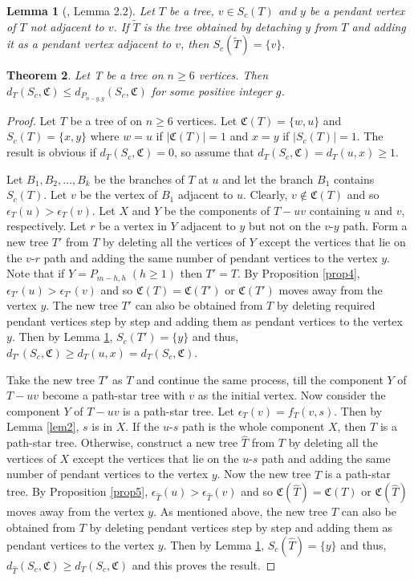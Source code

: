 \documentclass[11pt]{article}
\newtheorem{theorem}{Theorem}[section]
\newtheorem{lemma}[theorem]{Lemma}
\begin{document}
\begin{lemma}[\cite{Des}, Lemma 2.2]\label{lem:sc1}
Let $T$ be a tree, $v\in S_c(T)$ and $y$ be a pendant vertex of $T$ not adjacent to $v$. If $\tilde{T}$ is the tree obtained by detaching $y$ from $T$ and adding it as a pendant vertex adjacent to $v$, then $S_c(\tilde{T}) = \{v\}.$
\end{lemma}
\begin{theorem}\label{thm:sc1}
Let T be a tree on $n\geq 6$ vertices. Then  $d_T(S_c,\mathfrak{C})\leq d_{P_{n-g,g}}(S_c,\mathfrak{C})$ for some positive integer $g$.
\end{theorem}
\begin{proof}
Let $T$ be a tree of on $n\geq 6$ vertices. Let $\mathfrak{C}(T)=\{w,u\}$ and $S_c(T)=\{x,y\}$ where $w=u$ if $|\mathfrak{C}(T)|=1$ and $x=y$ if $|S_c(T)|=1$.  The result is obvious if $d_T(S_c,\mathfrak{C})=0$, so assume that  $d_T(S_c,\mathfrak{C})=d_T(u,x)\geq 1$.

Let $B_1,B_2,\ldots,B_k$ be the branches of $T$ at $u$ and let the branch $B_1$ contains $S_c(T).$ Let $v$ be the vertex of $B_1$ adjacent to $u$. Clearly, $v\notin \mathfrak{C}(T)$ and so $\epsilon_T(u)>\epsilon_T(v)$. Let $X$ and $Y$ be the components of $T-uv$ containing $u$ and $v$, respectively. Let $r$ be a vertex in $Y$ adjacent to $y$ but not on the $v$-$y$ path. Form  a new tree $T'$ from $T$ by deleting all the vertices of $Y$ except the vertices that lie on the $v$-$r$ path and adding the same number of pendant vertices to the vertex $y$. Note that if $Y=P_{m-h,h}\;(h\geq 1)$ then $T'=T.$ By Proposition \ref{prop4}, $\epsilon_{T'}(u)>\epsilon_{T'}(v)$ and so $\mathfrak{C}(T)=\mathfrak{C}(T')$ or $\mathfrak{C}(T')$ moves away from the vertex $y$. The new tree $T'$ can also be obtained from $T$ by deleting required pendant vertices step by step and adding them as pendant vertices to the vertex $y$. Then by Lemma \ref{lem:sc1}, $S_c(T')=\{y\}$ and thus,  $d_{T'}(S_c,\mathfrak{C})\geq d_T(u,x)=d_T(S_c,\mathfrak{C})$.

Take the new tree $T'$ as $T$ and continue the same process, till the component $Y$ of $T-uv$ become a path-star tree with $v$ as the initial vertex. Now consider the component $Y$ of $T-uv$ is a path-star tree. Let  $\epsilon_{T}(v)=f_T(v,s)$. Then by Lemma \ref{lem2}, $s$ is in $X$. If  the $u$-$s$ path is the whole component $X$, then $T$ is a path-star tree. Otherwise, construct a new tree 
$\hat{T}$ from $T$ by deleting all the vertices of $X$ except the vertices that lie on the $u$-$s$ path and adding the same number of pendant vertices to the vertex $y$. Now the new tree $\hat{T}$ is a path-star tree. By Proposition \ref{prop5}, $\epsilon_{\hat{T}}(u)>\epsilon_{\hat{T}}(v)$ and so $\mathfrak{C}(\hat{T})=\mathfrak{C}(T)$ or $\mathfrak{C}(\hat{T})$ moves away from the vertex $y$. As mentioned above, the new tree $\hat{T}$ can also be obtained from $T$ by deleting pendant vertices step by step and adding them as pendant vertices to the vertex $y$. Then by Lemma \ref{lem:sc1}, $S_c(\hat{T})=\{y\}$ and thus, $d_{\hat{T}}(S_c,\mathfrak{C})\geq d_T(S_c,\mathfrak{C})$ and this proves the result.
\end{proof}
\end{document}
